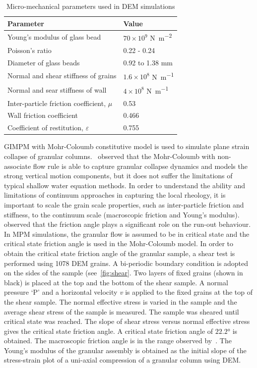 \begin{table}
\caption{Micro-mechanical parameters used in DEM simulations}
\label{table:DEM_data}
\centering
\begin{tabular}{ll}
\toprule
\textbf{Parameter} & \textbf{Value} \\ \midrule
Young's modulus of glass bead & $70\times10^{9}$ \si{\newton\per\m\squared}\\ 
Poisson's ratio & 0.22 - 0.24\\ 
Diameter of glass beads & 0.92 to 1.38 \si{\mm}\\
Normal and shear stiffness of grains & $1.6 \times 10^{8}$ \si{\newton\per\m}\\ 
Normal and sear stiffness of wall & $4 \times 10^{8}$ \si{\newton\per\m}\\
Inter-particle friction coefficient, $\mu$ & 0.53 \\
Wall friction coefficient & 0.466 \\ 
Coefficient of restitution, $\varepsilon$ & 0.755 \\ \bottomrule
\end{tabular}
\end{table}

GIMPM with Mohr-Coloumb constitutive model is used to simulate plane strain 
collapse of granular columns.~\citet{Crosta2009} observed that the Mohr-Coloumb 
with non-associate flow rule is able to capture granular collapse dynamics and 
models the strong vertical motion components, but it does not suffer the 
limitations of typical shallow water equation methods. In order to understand 
the ability and limitations of continuum approaches in capturing the local 
rheology, it is important to scale the grain scale properties, such as 
inter-particle friction and stiffness, to the continuum 
scale (macroscopic friction and Young's modulus).~\citet{Crosta2009} observed 
that the friction angle plays a significant role on the run-out behaviour. In 
MPM simulations, the granular flow is assumed to be in critical state and the 
critical state friction angle is used in the Mohr-Coloumb model. In order to 
obtain the critical state friction angle of the granular sample, a shear test 
is performed using 1078 DEM grains. A bi-periodic boundary condition is adopted 
on the sides of the sample (see~\cref{fig:shear}. Two layers of fixed grains 
(shown in black) is placed at the top and the bottom of the shear sample. A 
normal pressure `P' and a horizontal velocity \textit{v} is applied to the 
fixed grains  at the top of 
the shear sample. The normal effective stress is varied in the sample and the 
average shear stress of the sample is measured. The sample was sheared until 
critical state was reached. The slope of shear stress 
versus normal effective stress gives the critical state friction angle. A 
critical state friction angle of $22.2$\si{\degree} is obtained. The 
macroscopic friction angle is in the range observed 
by~\citet{Estrada2008,Mitchell2005}. The Young's 
modulus of the granular assembly is obtained as the initial slope of the 
stress-strain plot of a uni-axial compression of a granular column using DEM.

